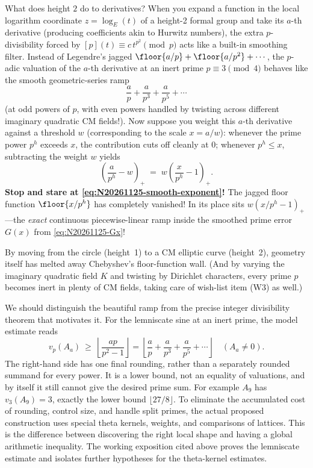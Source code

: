 What does height \(2\) do to derivatives? When you expand a function in the local logarithm coordinate \(z = \log_E(t)\) of a height-2 formal group and take its \(a\)-th derivative (producing coefficients akin to Hurwitz numbers), the extra \(p\)-divisibility forced by \([p](t) \equiv c\, t^{p^2} \pmod p\) acts like a built-in smoothing filter. Instead of Legendre's jagged \(\floor{a/p} + \floor{a/p^2} + \cdots\), the \(p\)-adic valuation of the \(a\)-th derivative at an inert prime \(p \equiv 3 \pmod 4\) behaves like the smooth geometric-series ramp
\[
  \frac{a}{p} + \frac{a}{p^3} + \frac{a}{p^5} + \cdots
\]
(at odd powers of \(p\), with even powers handled by twisting across different imaginary quadratic CM fields!). Now suppose you weight this \(a\)-th derivative against a threshold \(w\) (corresponding to the scale \(x = a/w\)): whenever the prime power \(p^h\) exceeds \(x\), the contribution cuts off cleanly at \(0\); whenever \(p^h \le x\), subtracting the weight \(w\) yields
\begin{equation}
  \left(\frac{a}{p^h} - w\right)_+
  \;=\;
  w\!\left(\frac{x}{p^h} - 1\right)_+.
  \label{eq:N20261125-smooth-exponent}
\end{equation}
\textbf{Stop and stare at \eqref{eq:N20261125-smooth-exponent}!} The jagged floor function \(\floor{x/p^h}\) has completely vanished! In its place sits \(w(x/p^h - 1)_+\)---the \emph{exact} continuous piecewise-linear ramp inside the smoothed prime error \(G(x)\) from \eqref{eq:N20261125-Gx}!

By moving from the circle (height~1) to a CM elliptic curve (height~2), geometry itself has melted away Chebyshev's floor-function wall. (And by varying the imaginary quadratic field \(K\) and twisting by Dirichlet characters, every prime \(p\) becomes inert in plenty of CM fields, taking care of wish-list item (W3) as well.)

We should distinguish the beautiful ramp from the precise integer divisibility theorem that motivates it. For the lemniscate sine at an inert prime, the model estimate reads
\[
 v_p(A_a)\ \geq\
 \left\lfloor\frac{ap}{p^2-1}\right\rfloor
 =\left\lfloor\frac ap+\frac a{p^3}
                  +\frac a{p^5}+\cdots\right\rfloor
 \quad(A_a\ne0).
\]
The right-hand side has one final rounding, rather than a separately rounded summand for every power. It is a lower bound, not an equality of valuations, and by itself it still cannot give the desired prime sum. For example \(A_9\) has \(v_3(A_9)=3\), exactly the lower bound \(\lfloor27/8\rfloor\). To eliminate the accumulated cost of rounding, control size, and handle split primes, the actual proposed construction uses special theta kernels, weights, and comparisons of lattices. This is the difference between discovering the right local shape and having a global arithmetic inequality. The working exposition cited above proves the lemniscate estimate and isolates further hypotheses for the theta-kernel estimates.

